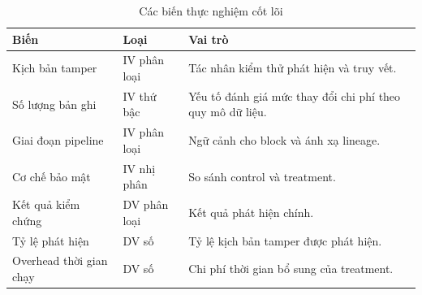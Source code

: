 \begin{table}[!t]
\centering
\footnotesize
\caption{Các biến thực nghiệm cốt lõi}
\label{tab:variables}
\begin{tabular}{|p{1.9cm}|p{1.4cm}|p{3.9cm}|}
\hline
\textbf{Biến} & \textbf{Loại} & \textbf{Vai trò} \\
\hline
Kịch bản tamper & IV phân loại & Tác nhân kiểm thử phát hiện và
truy vết. \\
\hline
Số lượng bản ghi & IV thứ bậc & Yếu tố đánh giá mức thay đổi chi phí theo quy mô dữ liệu. \\
\hline
Giai đoạn pipeline & IV phân loại & Ngữ cảnh cho block và ánh xạ lineage. \\
\hline
Cơ chế bảo mật & IV nhị phân & So sánh control và treatment. \\
\hline
Kết quả kiểm chứng & DV phân loại & Kết quả phát hiện chính. \\
\hline
Tỷ lệ phát hiện & DV số & Tỷ lệ kịch bản tamper được phát hiện. \\
\hline
Overhead thời gian chạy & DV số & Chi phí thời gian bổ sung của treatment. \\
\hline
\end{tabular}
\end{table}

\FloatBarrier
